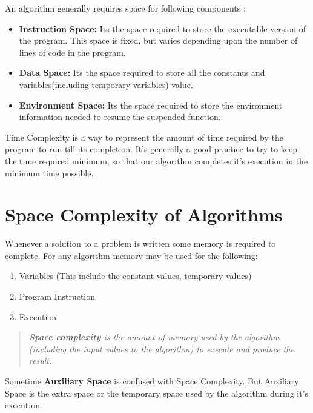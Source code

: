 An algorithm generally requires space for following components :

\begin{itemize}
	\tightlist
	\item
	      \textbf{Instruction Space:} Its the space required to store the
	      executable version of the program. This space is fixed, but varies
	      depending upon the number of lines of code in the program.
	\item
	      \textbf{Data Space:} Its the space required to store all the constants
	      and variables(including temporary variables) value.
	\item
	      \textbf{Environment Space:} Its the space required to store the
	      environment information needed to resume the suspended function.
\end{itemize}


\hypertarget{time-complexity}{%
	\label{time-complexity}}

Time Complexity is a way to represent the amount of time required by the program to run till its completion. It's generally a good practice to try to keep the time required minimum, so that our algorithm completes it's execution in the minimum time possible. 

\hypertarget{body-content}{}
\hypertarget{space-complexity-of-algorithms}{%
\section{Space Complexity of
Algorithms}\label{space-complexity-of-algorithms}}

Whenever a solution to a problem is written some memory is required to
complete. For any algorithm memory may be used for the following:

\begin{enumerate}
\tightlist
\item
  Variables (This include the constant values, temporary values)
\item
  Program Instruction
\item
  Execution
\end{enumerate}

\begin{quote}
\emph{\textbf{Space complexity} is the amount of memory used by the
algorithm (including the input values to the algorithm) to execute and
produce the result.}
\end{quote}

Sometime \textbf{Auxiliary Space} is confused with Space Complexity. But
Auxiliary Space is the extra space or the temporary space used by the
algorithm during it's execution.

